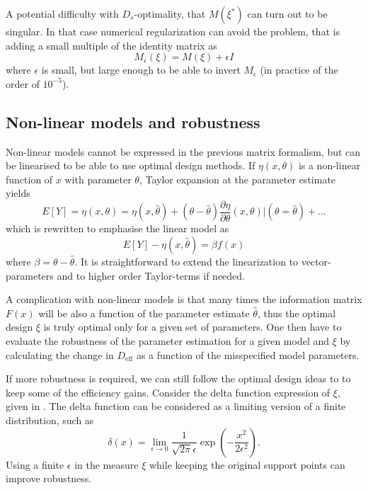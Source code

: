 \documentclass[12pt]{iopart}
\begin{document}
A potential difficulty with $D_s$-optimality, that $M(\xi^*)$ can turn out to be singular. In that case numerical regularization can avoid the problem, that is adding a small multiple of the identity matrix as
\begin{equation}
M_\epsilon(\xi) = M(\xi)  + \epsilon I
\end{equation}  
where $\epsilon$ is small, but large enough to be able to invert $M_\epsilon$ (in practice of the order of $10^{-5}$).

\subsection{Non-linear models and robustness}

Non-linear models cannot be expressed in the previous matrix formalism, but can be linearised to be able to use optimal design methods. If $\eta(x, \theta)$ is a non-linear function of $x$ with parameter $\theta$, Taylor expansion at the parameter estimate yields
\begin{equation}
E[Y] = \eta(x, \theta) = \eta(x, \hat \theta) + (\theta - \hat \theta) \frac{\partial \eta}{\partial \theta}(x, \theta)|(\theta = \hat \theta) + \ldots
\end{equation}
which is rewritten to emphasise the linear model as
\begin{equation}
E[Y] - \eta(x, \hat \theta) = \beta f(x)
\end{equation}
where $\beta = \theta - \hat \theta$. It is straightforward to extend the linearization to vector-parameters and to higher order Taylor-terms if needed.

A complication with non-linear models is that many times the information matrix $F(x)$ will be also a function of the parameter estimate $\hat \theta$, thus the optimal design $\xi$ is truly optimal only for a given set of parameters. One then have to evaluate the robustness of the parameter estimation for a given model and $\xi$ by calculating the change in $D_\mathrm{eff}$ as a function of the misspecified model parameters.

If more robustness is required, we can still follow the optimal design ideas to to keep some of the efficiency gains. Consider the delta function expression of $\xi$, given in . The delta function can be considered as a limiting version of a finite distribution, such as
\begin{equation}
\delta(x) = \lim_{\epsilon \rightarrow 0} \frac{1}{\sqrt{2 \pi} \epsilon } \exp\left(-\frac{x^2}{2 \epsilon^2}\right).
\label{eq:deltafinite}
\end{equation}
Using a finite $\epsilon$ in the measure $\xi$ while keeping the original support points can improve robustness. 
\end{document}
